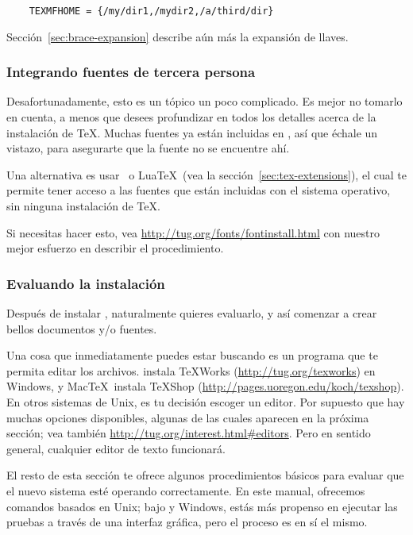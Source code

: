 \documentclass{article}
\begin{document}
\begin{verbatim}
	TEXMFHOME = {/my/dir1,/mydir2,/a/third/dir}
\end{verbatim}

Sección~\ref{sec:brace-expansion} describe aún más la expansión de llaves. 

\subsubsection{Integrando fuentes de tercera persona}

Desafortunadamente, esto es un tópico un poco complicado. Es mejor no
tomarlo en cuenta, a menos que desees profundizar en todos los
detalles acerca de la instalación de \TeX{}. Muchas fuentes ya están
incluidas en \TL, así que échale un vistazo, para asegurarte que la
fuente no se encuentre ahí.

Una alternativa es usar \XeTeX\ o Lua\TeX\ (vea la
sección~\ref{sec:tex-extensions}), el cual te permite tener acceso a
las fuentes que están incluidas con el sistema operativo, sin ninguna
instalación de \TeX. 

Si necesitas hacer esto, vea
\url{http://tug.org/fonts/fontinstall.html} con nuestro mejor esfuerzo
en describir el procedimiento. 

\subsubsection{Evaluando la instalación}
\label{sec:test-install}

Después de instalar \TL{}, naturalmente quieres evaluarlo, y así
comenzar a crear bellos documentos y\slash o fuentes. 

Una cosa que inmediatamente puedes estar buscando es un programa que te
permita editar los archivos. \TL{} instala \TeX{}Works
(\url{http://tug.org/texworks}) en Windows, y Mac\TeX\ instala TeXShop
(\url{http://pages.uoregon.edu/koch/texshop}). En otros sistemas de
Unix, es tu decisión escoger un editor. Por supuesto que hay muchas
opciones disponibles, algunas de las cuales aparecen en la próxima
sección; vea también \url{http://tug.org/interest.html#editors}. Pero
en sentido general, cualquier editor de texto funcionará.

El resto de esta sección te ofrece algunos procedimientos básicos para
evaluar que el nuevo sistema esté operando correctamente. En este
manual, ofrecemos comandos basados en Unix; bajo \MacOSX{} y Windows, estás
más propenso en ejecutar las pruebas a través de una interfaz gráfica,
pero el proceso es en sí el mismo. 
\end{document}
